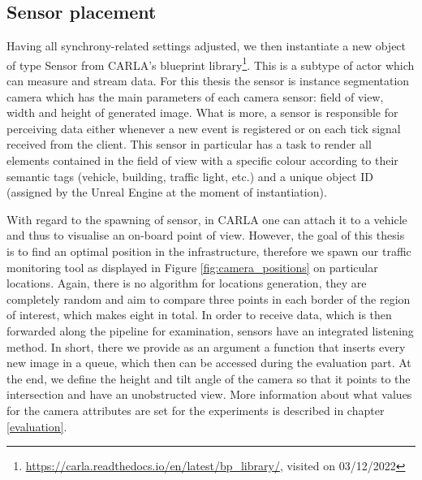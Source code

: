 \subsection{Sensor placement}
Having all synchrony-related settings adjusted, we then instantiate a new object of type Sensor from CARLA's blueprint library\footnote{\url{https://carla.readthedocs.io/en/latest/bp_library/}, visited on 03/12/2022}. This is a subtype of actor which can measure and stream data. For this thesis the sensor is instance segmentation camera which has the main parameters of each camera sensor: field of view, width and height of generated image. What is more, a sensor is responsible for perceiving data either whenever a new event is registered or on each tick signal received from the client. This sensor in particular has a task to render all elements contained in the field of view with a specific colour according to their semantic tags (vehicle, building, traffic light, etc.) and a unique object ID (assigned by the Unreal Engine at the moment of instantiation). 

With regard to the spawning of sensor, in CARLA one can attach it to a vehicle and thus to visualise an on-board point of view. However, the goal of this thesis is to find an optimal position in the infrastructure, therefore we spawn our traffic monitoring tool as displayed in Figure \ref{fig:camera_positions} on particular locations. Again, there is no algorithm for locations generation, they are completely random and aim to compare three points in each border of the region of interest, which makes eight in total. In order to receive data, which is then forwarded along the pipeline for examination, sensors have an integrated listening method. In short, there we provide as an argument a function that inserts every new image in a queue, which then can be accessed during the evaluation part. At the end, we define the height and tilt angle of the camera so that it points to the intersection and have an unobstructed view. More information about what values for the camera attributes are set for the experiments is described in chapter \ref{evaluation}.


